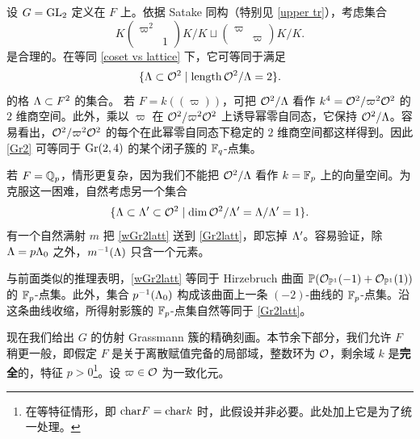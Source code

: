 \begin{ex}\label{quasiminuSch}
设 $G={\operatorname{GL}}_2$ 定义在 $F$ 上。依据 Satake 同构（特别见 \eqref{upper tr}），考虑集合
\begin{equation}\label{Gr2}
K\begin{pmatrix}\varpi^2 & \\ &1 \end{pmatrix}K/K\sqcup \begin{pmatrix}\varpi & \\ &\varpi \end{pmatrix} K/K.
\end{equation} 是合理的。在等同 \eqref{coset vs lattice} 下，它可等同于满足
\begin{equation}\label{Gr2latt}
\{{\Lambda}\subset {\mathcal O}^2\mid \operatorname{length}{\mathcal O}^2/{\Lambda}=2\}.
\end{equation}
的格 ${\Lambda}\subset F^2$ 的集合。
若 $F=k((\varpi))$，可把 ${\mathcal O}^2/{\Lambda}$ 看作 $k^4={\mathcal O}^2/\varpi^2{\mathcal O}^2$ 的 $2$ 维商空间。此外，乘以 $\varpi$ 在 ${\mathcal O}^2/\varpi^2{\mathcal O}^2$ 上诱导幂零自同态，它保持 ${\mathcal O}^2/{\Lambda}$。容易看出，${\mathcal O}^2/\varpi^2{\mathcal O}^2$ 的每个在此幂零自同态下稳定的 $2$ 维商空间都这样得到。因此 \eqref{Gr2} 可等同于 ${\operatorname{Gr}}(2,4)$ 的某个闭子簇的 ${\mathbb F}_q$-点集。

若 $F={\mathbb Q}_p$，情形更复杂，因为我们不能把 ${\mathcal O}^2/{\Lambda}$ 看作 $k={\mathbb F}_p$ 上的向量空间。为克服这一困难，自然考虑另一个集合
\begin{equation}\label{wGr2latt}
\{{\Lambda}\subset{\Lambda}'\subset {\mathcal O}^2\mid \dim{\mathcal O}^2/{\Lambda}'={\Lambda}/{\Lambda}'=1\}.
\end{equation}
有一个自然满射 $m$ 把 \eqref{wGr2latt} 送到 \eqref{Gr2latt}，即忘掉 ${\Lambda}'$。容易验证，除 ${\Lambda}=p{\Lambda}_0$ 之外，$m^{-1}({\Lambda})$ 只含一个元素。
 
与前面类似的推理表明，\eqref{wGr2latt} 等同于 Hirzebruch 曲面 ${\mathbb P}({\mathcal O}_{{\mathbb P}^1}(-1)+{\mathcal O}_{{\mathbb P}^1}(1))$ 的 ${\mathbb F}_p$-点集。此外，集合 $p^{-1}({\Lambda}_0)$ 构成该曲面上一条 $(-2)$-曲线的 ${\mathbb F}_p$-点集。沿这条曲线收缩，所得射影簇的 ${\mathbb F}_p$-点集自然等同于 \eqref{Gr2latt}。
\end{ex}

现在我们给出 $G$ 的仿射 Grassmann 簇的精确刻画。本节余下部分，我们允许 $F$ 稍更一般，即假定
$F$ 是关于离散赋值完备的局部域，整数环为 ${\mathcal O}$，剩余域 $k$ 是\textbf{完全}的，特征 $p>0$\footnote{在等特征情形，即 ${\operatorname{char}} F={\operatorname{char}} k$ 时，此假设并非必要。此处加上它是为了统一处理。}。设 $\varpi\in{\mathcal O}$ 为一致化元。

